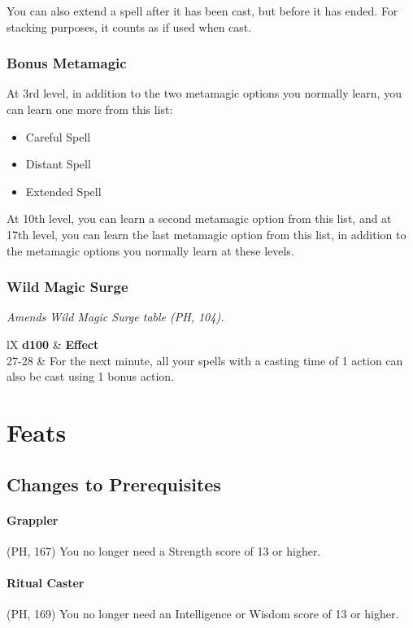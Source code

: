 \documentclass[letterpaper,twocolumn,openany,nodeprecatedcode]{dndbook}
\begin{document}
You can also extend a spell after it has been cast, but before it has ended. For stacking purposes, it counts as if used when cast.

\subsubsection{Bonus Metamagic}
At 3rd level, in addition to the two metamagic options you normally learn, you can learn one more from this list:

\begin{itemize}
\item Careful Spell
\item Distant Spell 
\item Extended Spell
\end{itemize}

At 10th level, you can learn a second metamagic option from this list, and at 17th level, you can learn the last metamagic option from this list, in addition to the metamagic options you normally learn at these levels.

\subsubsection{Wild Magic Surge}
\textit{Amends Wild Magic Surge table (PH, 104).}

\begin{DndTable}[]{lX}
    \textbf{d100} & \textbf{Effect} \\
    27-28 & For the next minute, all your spells with a casting time of 1 action can also be cast using 1 bonus action.
\end{DndTable}



\label{balance-feats}
\section{Feats}

\subsection{Changes to Prerequisites}

\paragraph{Grappler} (PH, 167) You no longer need a Strength score of 13 or higher.

\paragraph{Ritual Caster} (PH, 169) You no longer need an Intelligence or Wisdom score of 13 or higher.
\end{document}
